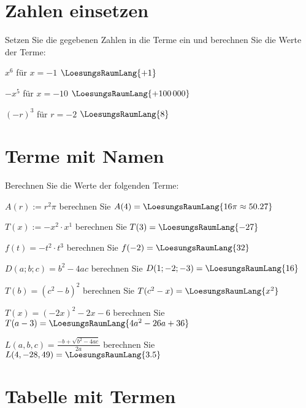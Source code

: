 \newpage


\section{Zahlen einsetzen}
Setzen Sie die gegebenen Zahlen in die Terme ein und berechnen Sie die
Werte der Terme:

\begin{bbwAufgabenBlock}
\item $x^6$ für $x=-1$ $\LoesungsRaumLang{+1}$
\item $-x^5$ für $x=-10$ $\LoesungsRaumLang{+100\,000}$
\item $(-r)^3$ für $r=-2$ $\LoesungsRaumLang{8}$
\end{bbwAufgabenBlock}
\newpage

\section{Terme mit Namen}
Berechnen Sie die Werte der folgenden Terme:

\begin{bbwAufgabenBlock}
\item $A(r):=r^2\pi$ berechnen Sie $A(4)= \LoesungsRaumLang{16\pi\approx{}50.27}$
\item $T(x):=-x^2\cdot{}x^1$ berechnen Sie $T(3)= \LoesungsRaumLang{-27}$
\item $f(t)=-t^2\cdot{}t^3$ berechnen Sie $f(-2)= \LoesungsRaumLang{32}$
\item $D(a;b;c)=b^2-4ac$ berechnen Sie $D(1;-2;-3)= \LoesungsRaumLang{16}$\newpage
\item $T(b)=(c^2-b)^2$ berechnen Sie $T(c^2-x)= \LoesungsRaumLang{x^2}$
\item $T(x)=(-2x)^2 -2x -6$ berechnen Sie $T(a-3)= \LoesungsRaumLang{4a^2-26a+36}$
\item $L(a,b,c)=\frac{-b+\sqrt{b^2-4ac}}{2a}$ berechnen Sie $L(4, -28, 49)= \LoesungsRaumLang{3.5}$
\end{bbwAufgabenBlock}
\newpage%

\section{Tabelle mit Termen}
\nextBbwAufgabenNummer{}

